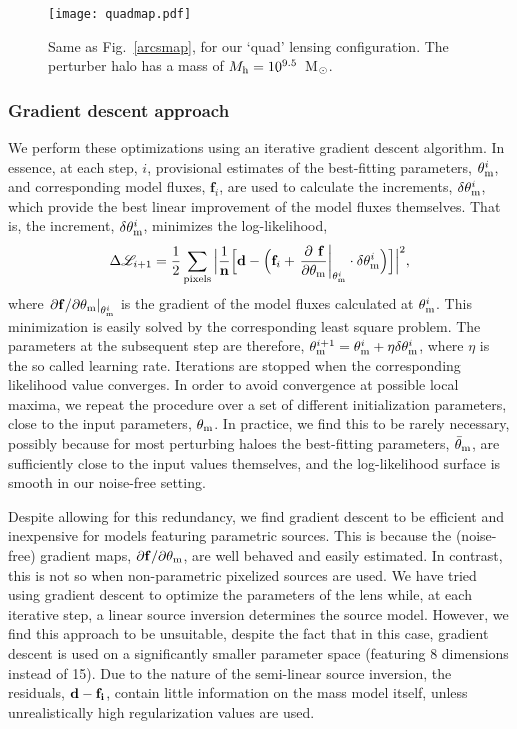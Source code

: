 \documentclass[a4paper, fleqn, usenatbib, useAMS]{mnras}
\def\tm{\theta_{\rm m}}
\def\DL{\Delta\mathscr{L}}
\begin{document}
\begin{figure*}
\centering
\texttt{[image: quadmap.pdf]}
\caption{Same as Fig.~\ref{arcsmap}, for our `quad' lensing configuration. The perturber halo has a mass of $M_{\rm h}=10^{9.5}$~M$_{\rm \odot}$.}
\label{quadmap}
\end{figure*}

\subsubsection{Gradient descent approach}
We perform these optimizations using an iterative gradient descent
algorithm. In essence, at each step, $i$, provisional  
estimates of the best-fitting parameters, $\tm^i$, and corresponding model fluxes, $\textbf{f}_i$, are used to 
calculate the increments, $\delta\tm^i$, which provide the best linear improvement of the model fluxes themselves.
That is, the increment, $\delta\tm^i$, minimizes the log-likelihood, 
\begin{equation}
\DL_{i+1} ={1\over 2}\sum_{\rm pixels}\Big|{1\over{\bf n}}\Big[\textbf{d}- \Big(\textbf{f}_i+\left.{\partial \textbf{ f}\over\partial \tm}\right|_{\tm^i}\cdot \delta\tm^i \Big)\Big]\Big|^{2},
\label{graddesceq}
\end{equation}
where $\left.{\partial \bf f / \partial \tm}\right|_{\tm^i}$ is the gradient of the model fluxes calculated
at $\tm^i$. This minimization is easily solved by the corresponding least square problem. 
The parameters at the subsequent step are therefore, $\tm^{i+1}=\tm^i+\eta \delta\tm^i$, 
where $\eta$ is the so called learning rate. Iterations are stopped when the corresponding likelihood value converges. 
In order to avoid convergence at possible local maxima, we repeat the procedure over a set of different initialization 
parameters, close to the input parameters, $\tm$. In practice, we find this to be rarely necessary, possibly because
for most perturbing haloes the best-fitting parameters, $\bar\theta_{\rm m}$, are sufficiently close to the input values themselves, and the log-likelihood surface is smooth in our noise-free setting. 

Despite allowing for this redundancy, we find gradient descent to be efficient and inexpensive for models featuring 
parametric sources. This is because the (noise-free) gradient maps, ${\partial \bf f /\partial \tm}$, are well behaved and easily
estimated. In contrast, this is not so when non-parametric pixelized sources are used. We have tried using gradient descent
to optimize the parameters of the lens while, at each iterative step, a linear source inversion \citep[e.g.][]{Warren2003, Dye2005} 
determines the source model. However, we find this approach to be unsuitable, despite the fact that in this case, 
gradient descent is used on a significantly smaller parameter space (featuring 8 dimensions instead of 15). 
Due to the nature of the semi-linear source inversion, the residuals, $\bf d-f_i$, contain 
little information on the mass model itself, unless unrealistically high regularization
values \citep[e.g.][]{Suyu2006} are used. 
\end{document}
